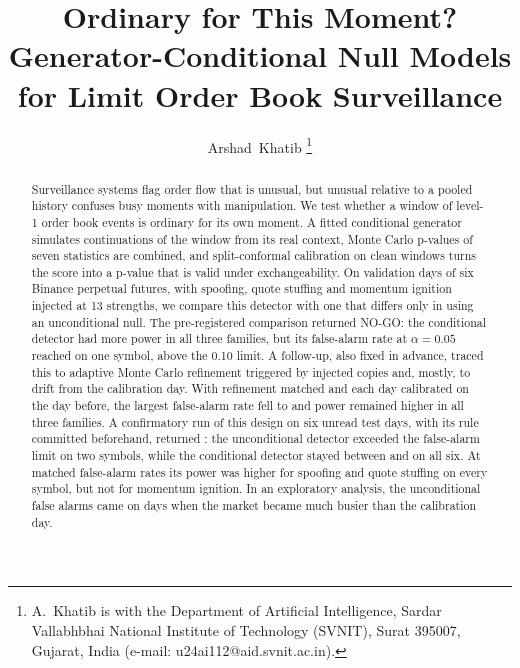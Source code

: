 \documentclass[journal]{IEEEtran}
\begin{document}
\title{Ordinary for This Moment? Generator-Conditional Null Models for Limit Order Book Surveillance}

\author{Arshad~Khatib%
\thanks{A.~Khatib is with the Department of Artificial Intelligence, Sardar Vallabhbhai National Institute of
Technology (SVNIT), Surat 395007, Gujarat, India (e-mail: u24ai112@aid.svnit.ac.in).}}


\maketitle

\begin{abstract}
Surveillance systems flag order flow that is unusual, but unusual relative to a pooled history confuses busy
moments with manipulation. We test whether a window of level-1 order book events is ordinary for its own moment.
A fitted conditional generator simulates continuations of the window from its real context, Monte Carlo
p-values of seven statistics are combined, and split-conformal calibration on clean windows turns the score
into a p-value that is valid under exchangeability. On validation days of six Binance perpetual futures, with
spoofing, quote stuffing and momentum ignition injected at 13 strengths, we compare this detector with one that
differs only in using an unconditional null. The pre-registered comparison returned NO-GO: the conditional
detector had more power in all three families, but its false-alarm rate at $\alpha=0.05$ reached \faGenXrp{} on
one symbol, above the 0.10 limit. A follow-up, also fixed in advance, traced this to adaptive Monte Carlo
refinement triggered by injected copies and, mostly, to drift from the calibration day. With refinement matched
and each day calibrated on the day before, the largest false-alarm rate fell to \faMaxGenVThree{} and power
remained higher in all three families. A confirmatory run of this design on six unread test days, with its rule
committed beforehand, returned \confOutcome: the unconditional detector exceeded the false-alarm limit on two
symbols, while the conditional detector stayed between \faConfGenXrp{} and \faConfMaxGen{} on all six. At matched
false-alarm rates its power was higher for spoofing and quote stuffing on every symbol, but not for momentum
ignition. In an exploratory analysis, the unconditional false alarms came on days when the market became much
busier than the calibration day.
\end{abstract}
\end{document}

